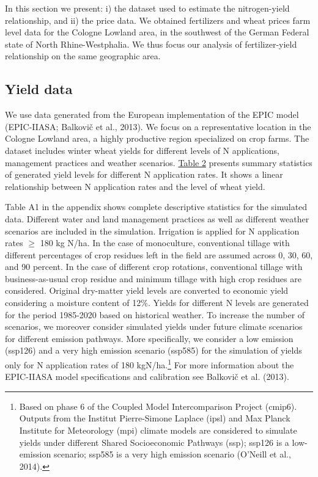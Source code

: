 \documentclass[
]{article}
\begin{document}
In this section we present: i) the dataset used to estimate the
nitrogen-yield relationship, and ii) the price data. We obtained
fertilizers and wheat prices farm level data for the Cologne Lowland
area, in the southwest of the German Federal state of North
Rhine-Westphalia. We thus focus our analysis of fertilizer-yield
relationship on the same geographic area.

\subsection{\texorpdfstring{Yield data }{Yield data }}\label{yield-data}

We use data generated from the European implementation of the EPIC model
(EPIC-IIASA; Balkovič et al., 2013). We focus on a representative
location in the Cologne Lowland area, a highly productive region
specialized on crop farms. The dataset includes winter wheat yields for
different levels of N applications, management practices and weather
scenarios. \hyperref[_Ref212044160]{Table 2} presents summary statistics
of generated yield levels for different N application rates. It shows a
linear relationship between N application rates and the level of wheat
yield.

Table A1 in the appendix shows complete descriptive statistics for the
simulated data. Different water and land management practices as well as
different weather scenarios are included in the simulation. Irrigation
is applied for N application rates \(\geq\) 180 kg N/ha. In the case of
monoculture, conventional tillage with different percentages of crop
residues left in the field are assumed across 0, 30, 60, and 90 percent.
In the case of different crop rotations, conventional tillage with
business-as-usual crop residue and minimum tillage with high crop
residues are considered. Original dry-matter yield levels are converted
to economic yield considering a moisture content of 12\%. Yields for
different N levels are generated for the period 1985-2020 based on
historical weather. To increase the number of scenarios, we moreover
consider simulated yields under future climate scenarios for different
emission pathways. More specifically, we consider a low emission
(ssp126) and a very high emission scenario (ssp585) for the simulation
of yields only for N application rates of 180 kgN/ha.\footnote{Based on
  phase 6 of the Coupled Model Intercomparison Project (cmip6). Outputs
  from the Institut Pierre-Simone Laplace (ipsl) and Max Planck
  Institute for Meteorology (mpi) climate models are considered to
  simulate yields under different Shared Socioeconomic Pathways (ssp);
  ssp126 is a low-emission scenario; ssp585 is a very high emission
  scenario (O'Neill et al., 2014).} For more information about the
EPIC-IIASA model specifications and calibration see Balkovič et al.
(2013).
\end{document}
